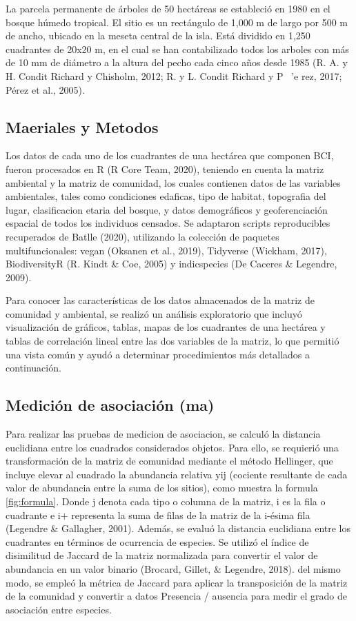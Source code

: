 \documentclass[11pt,]{article}
\begin{document}
La parcela permanente de árboles de 50 hectáreas se estableció en 1980
en el bosque húmedo tropical. El sitio es un rectángulo de 1,000 m de
largo por 500 m de ancho, ubicado en la meseta central de la isla. Está
dividido en 1,250 cuadrantes de 20x20 m, en el cual se han contabilizado
todos los arboles con más de 10 mm de diámetro a la altura del pecho
cada cinco años desde 1985 (R. A. y H. Condit Richard y Chisholm, 2012;
R. y L. Condit Richard y P ~'e rez, 2017; Pérez et al., 2005).

\subsection{Maeriales y Metodos}\label{maeriales-y-metodos}

Los datos de cada uno de los cuadrantes de una hectárea que componen
BCI, fueron procesados en R (R Core Team, 2020), teniendo en cuenta la
matriz ambiental y la matriz de comunidad, los cuales contienen datos de
las variables ambientales, tales como condiciones edaficas, tipo de
habitat, topografia del lugar, clasificacion etaria del bosque, y datos
demográficos y geoferenciación espacial de todos los individuos
censados. Se adaptaron scripts reproducibles recuperados de Batlle
(2020), utilizando la colección de paquetes multifuncionales: vegan
(Oksanen et al., 2019), Tidyverse (Wickham, 2017), BiodiversityR (R.
Kindt \& Coe, 2005) y indicspecies (De Caceres \& Legendre, 2009).

Para conocer las características de los datos almacenados de la matriz
de comunidad y ambiental, se realizó un análisis exploratorio que
incluyó visualización de gráficos, tablas, mapas de los cuadrantes de
una hectárea y tablas de correlación lineal entre las dos variables de
la matriz, lo que permitió una vista común y ayudó a determinar
procedimientos más detallados a continuación.

\subsection{Medición de asociación
(ma)}\label{mediciuxf3n-de-asociaciuxf3n-ma}

Para realizar las pruebas de medicion de asociacion, se calculó la
distancia euclidiana entre los cuadrados considerados objetos. Para
ello, se requierió una transformación de la matriz de comunidad mediante
el método Hellinger, que incluye elevar al cuadrado la abundancia
relativa yij (cociente resultante de cada valor de abundancia entre la
suma de los sitios), como muestra la formula \ref{fig:formula}. Donde j
denota cada tipo o columna de la matriz, i es la fila o cuadrante e i+
representa la suma de filas de la matriz de la i-ésima fila (Legendre \&
Gallagher, 2001). Además, se evaluó la distancia euclidiana entre los
cuadrantes en términos de ocurrencia de especies. Se utilizó el índice
de disimilitud de Jaccard de la matriz normalizada para convertir el
valor de abundancia en un valor binario (Brocard, Gillet, \& Legendre,
2018). del mismo modo, se empleó la métrica de Jaccard para aplicar la
transposición de la matriz de la comunidad y convertir a datos Presencia
/ ausencia para medir el grado de asociación entre especies.
\end{document}
